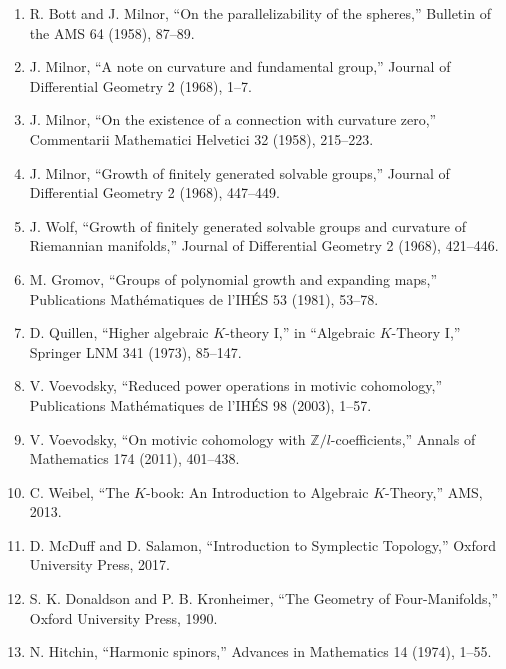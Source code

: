 \begin{enumerate}
\item R. Bott and J. Milnor, ``On the parallelizability of the spheres,'' Bulletin of the AMS 64 (1958), 87--89.
\item J. Milnor, ``A note on curvature and fundamental group,'' Journal of Differential Geometry 2 (1968), 1--7.
\item J. Milnor, ``On the existence of a connection with curvature zero,'' Commentarii Mathematici Helvetici 32 (1958), 215--223.
\item J. Milnor, ``Growth of finitely generated solvable groups,'' Journal of Differential Geometry 2 (1968), 447--449.
\item J. Wolf, ``Growth of finitely generated solvable groups and curvature of Riemannian manifolds,'' Journal of Differential Geometry 2 (1968), 421--446.
\item M. Gromov, ``Groups of polynomial growth and expanding maps,'' Publications Math\'ematiques de l'IH\'ES 53 (1981), 53--78.
\item D. Quillen, ``Higher algebraic $K$-theory I,'' in ``Algebraic $K$-Theory I,'' Springer LNM 341 (1973), 85--147.
\item V. Voevodsky, ``Reduced power operations in motivic cohomology,'' Publications Math\'ematiques de l'IH\'ES 98 (2003), 1--57.
\item V. Voevodsky, ``On motivic cohomology with $\mathbb{Z}/l$-coefficients,'' Annals of Mathematics 174 (2011), 401--438.
\item C. Weibel, ``The $K$-book: An Introduction to Algebraic $K$-Theory,'' AMS, 2013.
\item D. McDuff and D. Salamon, ``Introduction to Symplectic Topology,'' Oxford University Press, 2017.
\item S. K. Donaldson and P. B. Kronheimer, ``The Geometry of Four-Manifolds,'' Oxford University Press, 1990.
\item N. Hitchin, ``Harmonic spinors,'' Advances in Mathematics 14 (1974), 1--55.
\end{enumerate}

